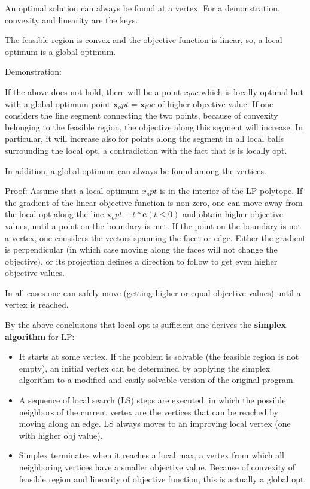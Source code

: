 \documentclass[10pt]{article}
\begin{document}
An optimal solution can always be found at a vertex. For a demonstration, convexity and linearity are the keys.

The feasible region is convex and the objective function is linear, so, a local optimum is a global optimum. 

Demonstration:
 
If the above does not hold, there will be a point $ x_loc $ which is locally optimal but with a global optimum point $ \textbf{x}_opt = \textbf{x}_loc $ of higher objective value. If one considers the line segment connecting the two points, because of convexity belonging to the feasible region, the objective along this segment will increase. In particular, it will increase also for points along the segment in all local balls surrounding the local opt, a contradiction with the fact that is is locally opt.

In addition, a global optimum can always be found among the vertices.

Proof: 
Assume that a local optimum $ x_opt $ is in the interior of the LP polytope. If the gradient of the linear objective function is non-zero, one can move away from the local opt along the line $ \textbf{x}_opt + t*\textbf{c} (t \leq 0) $ and obtain higher objective values, until a point on the boundary is met. If the point on the boundary is not a vertex, one considers the vectors spanning the facet or edge. Either the gradient is perpendicular (in which case moving along the faces will not change the objective), or its projection defines a direction to follow to get even higher objective values. 

In all cases one can safely move (getting higher or equal objective values) until a vertex is reached.

By the above conclusions that local opt is sufficient one derives the \textbf{simplex algorithm} for LP:

\begin{itemize}
\item It starts at some vertex. If the problem is solvable (the feasible region is not empty), an initial vertex can be determined by applying the simplex algorithm to a modified and easily solvable version of the original program. 
\item A sequence of local search (LS) steps are executed, in which the possible neighbors of the current vertex are the vertices that can be reached by moving along an edge. LS always moves to an improving local vertex (one with higher obj value).
\item Simplex terminates when it reaches a local max, a vertex from which all neighboring vertices have a smaller objective value. Because of convexity of feasible region and linearity of objective function, this is actually a global opt.
\end{itemize}
\end{document}
